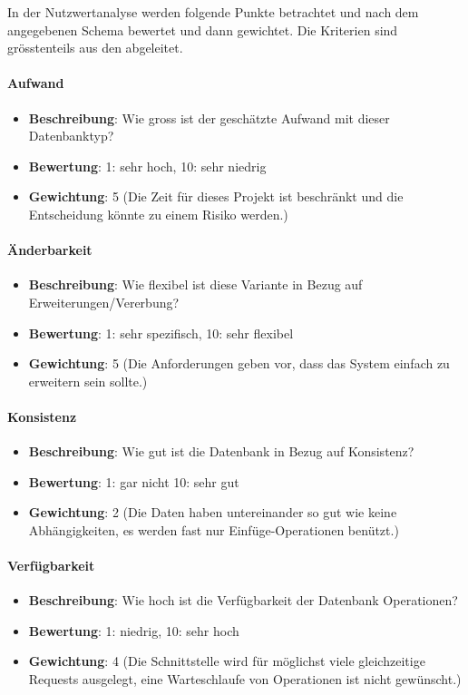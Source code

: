 In der Nutzwertanalyse werden folgende Punkte betrachtet und nach dem angegebenen Schema bewertet und dann gewichtet. 
Die Kriterien sind grösstenteils aus den  abgeleitet.

\paragraph{Aufwand}
\begin{itemize}
	\item \textbf{Beschreibung}: Wie gross ist der geschätzte Aufwand mit dieser Datenbanktyp?
	\item \textbf{Bewertung}: 1: sehr hoch, 10: sehr niedrig
	\item \textbf{Gewichtung}: 5 (Die Zeit für dieses Projekt ist beschränkt und die Entscheidung könnte zu einem Risiko werden.)
\end{itemize}

\paragraph{Änderbarkeit}
\begin{itemize}
	\item \textbf{Beschreibung}: Wie flexibel ist diese Variante in Bezug auf Erweiterungen/Vererbung?
	\item \textbf{Bewertung}: 1: sehr spezifisch, 10: sehr flexibel
	\item \textbf{Gewichtung}: 5 (Die Anforderungen geben vor, dass das System einfach zu erweitern sein sollte.)
\end{itemize}

\paragraph{Konsistenz}
\begin{itemize}
	\item \textbf{Beschreibung}: Wie gut ist die Datenbank in Bezug auf Konsistenz?
	\item \textbf{Bewertung}: 1: gar nicht 10: sehr gut
	\item \textbf{Gewichtung}: 2 (Die Daten haben untereinander so gut wie keine Abhängigkeiten, es werden fast nur Einfüge-Operationen benützt.)
\end{itemize}

\paragraph{Verfügbarkeit}
\begin{itemize}
	\item \textbf{Beschreibung}: Wie hoch ist die Verfügbarkeit der Datenbank Operationen?
	\item \textbf{Bewertung}: 1: niedrig, 10: sehr hoch
	\item \textbf{Gewichtung}: 4 (Die Schnittstelle wird für möglichst viele gleichzeitige Requests ausgelegt, eine Warteschlaufe von Operationen ist nicht gewünscht.)
\end{itemize}

